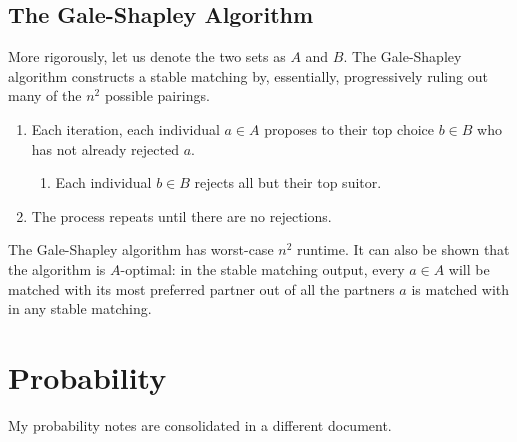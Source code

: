 \documentclass[12pt]{article}
\begin{document}
\subsection{The Gale-Shapley Algorithm}

More rigorously, let us denote the two sets as $A$ and $B$. The Gale-Shapley algorithm constructs a stable matching by, essentially, progressively ruling out many of the $n^2$ possible pairings.
\begin{enumerate}
\item Each iteration, each individual $a \in A$ proposes to their top choice $b \in B$ who has not already rejected $a$.
\begin{enumerate}
\item Each individual $b \in B$ rejects all but their top suitor.
\end{enumerate}
\item The process repeats until there are no rejections.
\end{enumerate}

The Gale-Shapley algorithm has worst-case $n^2$ runtime. It can also be shown that the algorithm is $A$-optimal: in the stable matching output, every $a \in A$ will be matched with its most preferred partner out of all the partners $a$ is matched with in any stable matching.

\section{Probability}

My probability notes are consolidated in a different document.
\end{document}
